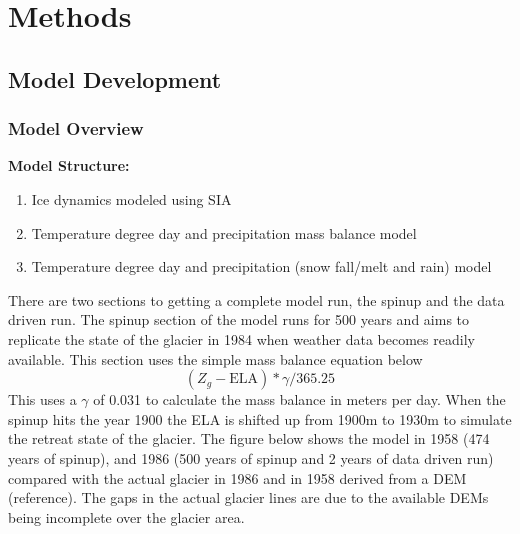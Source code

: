 \documentclass{article}
\begin{document}
\section{Methods}

\subsection{Model Development}
\subsubsection{Model Overview}

\textbf{Model Structure:}
\begin{enumerate}[leftmargin=2cm]
    \item Ice dynamics modeled using SIA
    \item Temperature degree day and precipitation mass balance model
    \item Temperature degree day and precipitation (snow fall/melt and rain) model
\end{enumerate}

There are two sections to getting a complete model run, the spinup and the data driven run. The spinup section of the model runs for 500 years and aims to replicate the 
state of the glacier in 1984 when weather data becomes readily available. This section uses the simple mass balance equation below
\begin{equation}(Z_g-\text{ELA})*\gamma /365.25\end{equation}
This uses a $\gamma$ of 0.031 to calculate the mass balance in meters per day. When the spinup hits the year 1900 the ELA is shifted up from 1900m to 1930m to simulate the 
retreat state of the glacier. The figure below shows the model in 1958 (474 years of spinup), and 1986 (500 years of spinup and 2 years of data driven run) compared with the actual 
glacier in 1986 and in 1958 derived from a DEM (reference). The gaps in the actual glacier lines are due to the available DEMs being incomplete over the glacier area.
\end{document}

